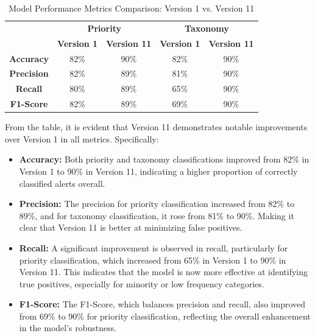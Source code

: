 \clearpage

\begin{table}[h!]
    \centering  
    \caption{Model Performance Metrics Comparison: Version 1 vs. Version 11}
    \label{tab:results_comparative}
    \begin{tabular}{@{}ccccc@{}}
        \toprule
        \multirow{2}{0em}{} & \multicolumn{2}{c}{\textbf{Priority}} & \multicolumn{2}{c}{\textbf{Taxonomy}} \\
        & \textbf{Version 1} & \textbf{Version 11} & \textbf{Version 1} & \textbf{Version 11} \\
        \hline
        \textbf{Accuracy} & 82\% & 90\% & 82\% & 90\% \\
        \textbf{Precision} & 82\% & 89\% & 81\% & 90\% \\
        \textbf{Recall} & 80\% & 89\% & 65\% & 90\% \\
        \textbf{F1-Score} & 82\% & 89\% & 69\% & 90\% \\
        \bottomrule
    \end{tabular}
\end{table}

From the table, it is evident that Version 11 demonstrates notable improvements over Version 1 in all metrics. Specifically:

\begin{itemize}
    \item \textbf{Accuracy:} Both priority and taxonomy classifications improved from 82\% in Version 1 to 90\% in Version 11, indicating a higher proportion of correctly classified alerts overall.
    \item \textbf{Precision:} The precision for priority classification increased from 82\% to 89\%, and for taxonomy classification, it rose from 81\% to 90\%. Making it clear that Version 11 is better at minimizing false positives.
    \item \textbf{Recall:} A significant improvement is observed in recall, particularly for priority classification, which increased from 65\% in Version 1 to 90\% in Version 11. This indicates that the model is now more effective at identifying true positives, especially for minority or low frequency categories.
    \item \textbf{F1-Score:} The F1-Score, which balances precision and recall, also improved from 69\% to 90\% for priority classification, reflecting the overall enhancement in the model's robustness.
\end{itemize}

